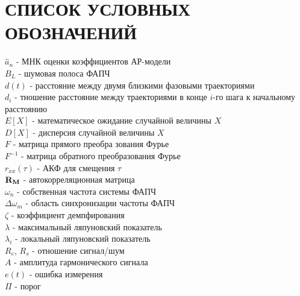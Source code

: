 \section*{СПИСОК УСЛОВНЫХ ОБОЗНАЧЕНИЙ}
\noindent
${\hat{a}_n}$ - МНК оценки коэффициентов АР-модели		\\
${B_L}$ - шумовая полоса ФАПЧ					\\
${d(t)}$ - расстояние между двумя близкими фазовыми траекториями	\\
${d_i}$ - тношение расстояние между траекториями в конце ${i}$-го шага к начальному расстоянию\\
${E[X]}$ - математическое ожидание случайной величины $X$	\\
${D[X]}$ - дисперсия случайной величины $X$			\\
${F}$ - матрица прямого преобра зования Фурье			\\
${F^{-1}}$ - матрица обратного преобразования Фурье		\\
${r_{xx}(\tau)}$ - АКФ для смещения ${\tau}$			\\
${\bf{R_M}}$ - автокорреляционная матрица			\\
${\omega_n}$ - собственная частота системы ФАПЧ			\\
${\Delta \omega_m}$ - область синхронизации частоты ФАПЧ	\\
${\zeta}$ - коэффициент демпфирования				\\
${\lambda}$ - максимальный ляпуновский показатель		\\
${\lambda_{i}}$ - локальный ляпуновский показатель		\\
${R_e}$, ${R_s}$ - отношение сигнал/шум				\\
${A}$ - амплитуда гармонического сигнала			\\
${e(t)}$ - ошибка измерения					\\
${\Pi}$ - порог							\\
\newpage
